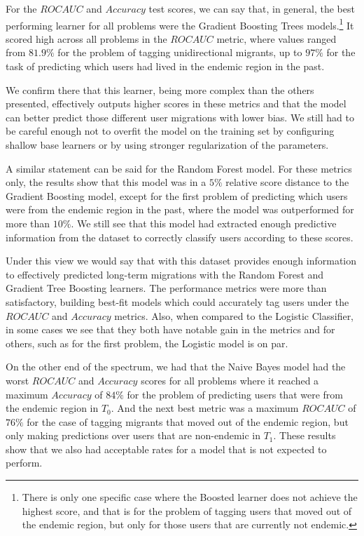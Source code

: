 For the $ROC AUC$ and $Accuracy$ test scores, we can say that, in general, the best performing learner for all problems were the Gradient Boosting Trees models.\footnote{There is only one specific case where the Boosted learner does not achieve the highest score, and that is for the problem of tagging users that moved out of the endemic region, but only for those users that are currently not endemic.}
It scored high across all problems in the $ROC AUC$ metric, where values ranged from $81.9\%$ for the problem of tagging unidirectional migrants, up to $97\%$ for the task of predicting which users had lived in the endemic region in the past.

We confirm there that this learner, being more complex than the others presented, effectively outputs higher scores in these metrics and
that the model can better predict those different user migrations with lower bias.
We still had to be careful enough not to overfit the model on the training set by configuring shallow base learners or by using stronger regularization of the parameters.

A similar statement can be said for the Random Forest model.
For these metrics only, the results show that this model was in a $5\%$ relative score distance to the Gradient Boosting model, except for the first problem of predicting which users were from the endemic region in the past, where the model was outperformed for more than $10\%$.
We still see that this model had extracted enough predictive information from the dataset to correctly classify users according to these scores.

Under this view we would say that with this dataset provides enough information to effectively predicted long-term migrations with the Random Forest and Gradient Tree Boosting learners.
The performance metrics were more than satisfactory, building best-fit models which could accurately tag users under the $ROC AUC$ and $Accuracy$ metrics.
Also, when compared to the Logistic Classifier, in some cases we see that they both have notable gain in the metrics and for others, such as for the first problem, the Logistic model is on par.

On the other end of the spectrum, we had that the Naive Bayes model had the worst $ROC AUC$ and $Accuracy$ scores for all problems where it reached a maximum $Accuracy$ of $84\%$ for the problem of predicting users that were from the endemic region in $T_0$.
And the next best metric was a maximum $ROC AUC$ of $76\%$ for the case of tagging migrants that moved out of the endemic region, but only making predictions over users that are non-endemic in $T_1$.
These results show that we also had acceptable rates for a model that is not expected to perform.  

